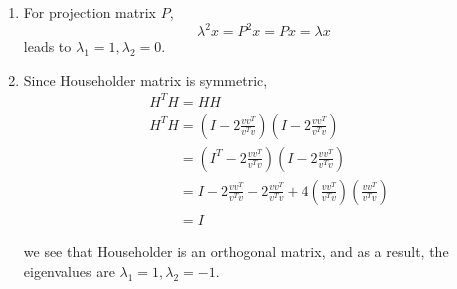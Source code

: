 \documentclass[11pt]{article}
\begin{document}
	\begin{enumerate}
		\item For projection matrix $P$, 
		\[\lambda^2x = P^2x = Px = \lambda x\]
		leads to $\lambda_1 = 1, \lambda_2 = 0$.
		
		\item Since Householder matrix is symmetric, 
		\begin{align}
			&H^TH = HH\nonumber\\
			&H^TH = (I - 2\frac{vv^T}{v^Tv}) (I - 2\frac{vv^T}{v^Tv})\nonumber\\
			&\phantom{H^TH} = (I^T - 2\frac{vv^T}{v^Tv}) (I - 2\frac{vv^T}{v^Tv})\nonumber\\
			&\phantom{H^TH} = I - 2\frac{vv^T}{v^Tv} - 2\frac{vv^T}{v^Tv} + 4(\frac{vv^T}{v^Tv})(\frac{vv^T}{v^Tv})\nonumber\\
			&\phantom{H^TH} = I\nonumber
		\end{align}
		
		we see that Householder is an orthogonal matrix, and as a result, the eigenvalues are $\lambda_1 = 1, \lambda_2 = -1$.
	\end{enumerate}
\end{document}
